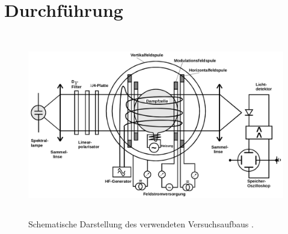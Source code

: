 \newpage
\section{Durchführung}
\label{sec:Durchführung}

\begin{figure}
  \centering
  \includegraphics[height=8.0cm]{content/pictures/Aufbau.png}
  \caption{Schematische Darstellung des verwendeten Versuchsaufbaus \cite{anleitung}.}
  \label{fig:Versuchsaufbau}
\end{figure}

\FloatBarrier